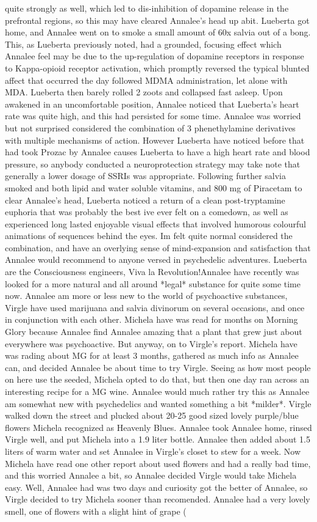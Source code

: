 \documentclass[12pt]{book}
\begin{document}
quite strongly as well, which led to dis-inhibition of dopamine release in the prefrontal regions, so this may have cleared Annalee's head up abit. Lueberta got home, and Annalee went on to smoke a small amount of 60x salvia out of a bong. This, as Lueberta previously noted, had a grounded, focusing effect which Annalee feel may be due to the up-regulation of dopamine receptors in response to Kappa-opioid receptor activation, which promptly reversed the typical blunted affect that occurred the day followed MDMA administration, let alone with MDA. Lueberta then barely rolled 2 zoots and collapsed fast asleep. Upon awakened in an uncomfortable position, Annalee noticed that Lueberta's heart rate was quite high, and this had persisted for some time. Annalee was worried but not surprised considered the combination of 3 phenethylamine derivatives with multiple mechanisms of action. However Lueberta have noticed before that had took Prozac by Annalee causes Lueberta to have a high heart rate and blood pressure, so anybody conducted a neuroprotection strategy may take note that generally a lower dosage of SSRIs was appropriate. Following further salvia smoked and both lipid and water soluble vitamins, and 800 mg of Piracetam to clear Annalee's head, Lueberta noticed a return of a clean post-tryptamine euphoria that was probably the best ive ever felt on a comedown, as well as experienced long lasted enjoyable visual effects that involved humorous colourful animations of sequences behind the eyes. Im felt quite normal considered the combination, and have an overlying sense of mind-expansion and satisfaction that Annalee would recommend to anyone versed in psychedelic adventures. Lueberta are the Consciousness engineers, Viva la Revolution!Annalee have recently was looked for a more natural and all around *legal* substance for quite some time now. Annalee am more or less new to the world of psychoactive substances, Virgle have used marijuana and salvia divinorum on several occasions, and once in conjunction with each other. Michela have was read for months on Morning Glory because Annalee find Annalee amazing that a plant that grew just about everywhere was psychoactive. But anyway, on to Virgle's report. Michela have was rading about MG for at least 3 months, gathered as much info as Annalee can, and decided Annalee be about time to try Virgle. Seeing as how most people on here use the seeded, Michela opted to do that, but then one day ran across an interesting recipe for a MG wine. Annalee would much rather try this as Annalee am somewhat new with psychedelics and wanted something a bit *milder*. Virgle walked down the street and plucked about 20-25 good sized lovely purple/blue flowers Michela recognized as Heavenly Blues. Annalee took Annalee home, rinsed Virgle well, and put Michela into a 1.9 liter bottle. Annalee then added about 1.5 liters of warm water and set Annalee in Virgle's closet to stew for a week. Now Michela have read one other report about used flowers and had a really bad time, and this worried Annalee a bit, so Annalee decided Virgle would take Michela easy. Well, Annalee had was two days and curiosity got the better of Annalee, so Virgle decided to try Michela sooner than recomended. Annalee had a very lovely smell, one of flowers with a slight hint of grape ( 
\end{document}
